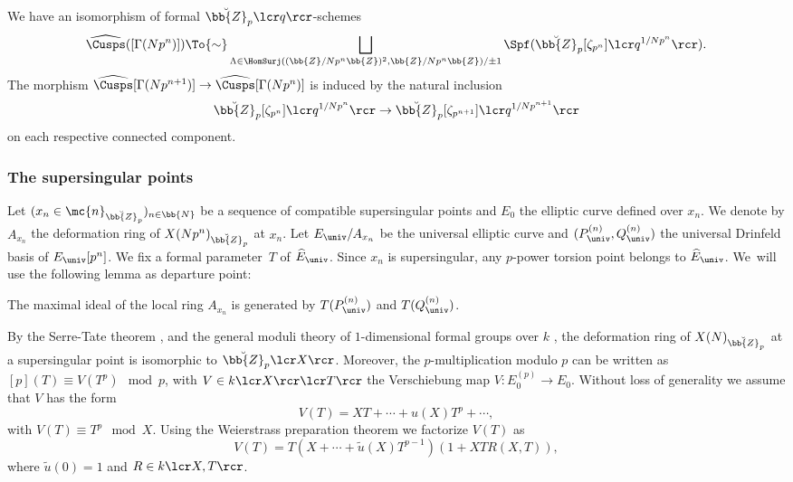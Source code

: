 \begin{prop}
\label{Theorem structure cusps 2}
We have an isomorphism of formal $\breve{\bb{Z}}_p\lcr q\rcr$-schemes
\begin{equation*}
\widehat{\Cusps}(\left[\Gamma(Np^n)\right]) \To{\sim} \displaystyle\bigsqcup_{\Lambda\in \HomSurj((\bb{Z}/Np^n\bb{Z})^2,\bb{Z}/Np^n\bb{Z})/\pm 1} \Spf (\breve{\bb{Z}}_p[\zeta_{p^n}]\lcr q^{1/Np^n}\rcr).
\end{equation*}
The morphism $\widehat{\Cusps}[\Gamma(Np^{n+1})]\to \widehat{\Cusps}[\Gamma(Np^n)]$ is induced by the natural inclusion
\[
\breve{\bb{Z}}_p[\zeta_{p^n}]\lcr q^{1/Np^{n}}\rcr\to \breve{\bb{Z}}_p[\zeta_{p^{n+1}}]\lcr q^{1/Np^{n+1}}\rcr
\]
on each respective connected component.
\end{prop}

\subsubsection*{The supersingular points}

Let $(x_n\in \mc{n}_{\breve{\bb{Z}}_p})_{n\in \bb{N}}$ be a sequence of compatible supersingular points and $E_0$ the elliptic curve defined over $x_n$. We denote by $A_{x_n}$ the deformation ring of $X(Np^n)_{\breve{\bb{Z}}_p}$ at $x_n$. Let $E_{\univ}/A_{x_n}$ be the universal elliptic curve and $(P^{(n)}_{\univ},Q^{(n)}_{\univ})$ the universal Drinfeld basis of $E_{\univ}[p^n]$. We fix a formal parameter~$T$ of $\widehat{E}_{\univ}$. Since $x_n$ is supersingular, any $p$-power torsion point belongs to $\widehat{E}_{\univ}$. We~will use the following lemma as departure point:

\begin{lem}
\label{Lemma generators max ideal}
The maximal ideal of the local ring $A_{x_n}$ is generated by $T(P^{(n)}_{\univ})$ and $T(Q^{(n)}_{\univ})$.
\end{lem}

By the Serre-Tate theorem \cite[Th.\,1.2.1]{katz1981serre}, and the general moduli theory of $1$-dimensional formal groups over $k$ \cite{MR238854}, the deformation ring of $X(N)_{\breve{\bb{Z}}_p}$ at a supersingular point is isomorphic to $\breve{\bb{Z}}_p\lcr X\rcr$. Moreover, the $p$-multiplication modulo $p$ can be written as $[p](T)\equiv V(T^p) \mod p$, with $V\in k\lcr X\rcr\lcr T\rcr$ the Verschiebung map $V: E_0^{(p)}\to E_0$. Without loss of generality we assume that $V$ has the form
\[
V(T)= XT+\cdots+ u(X)T^p+\cdots,
\]
with $V(T)\equiv T^p \mod X$. Using the Weierstrass preparation theorem we factorize $V(T)$ as
\begin{equation}
\label{verschpowerseries}
V(T)=T(X+\cdots +\tilde{u}(X)T^{p-1})(1+XT R(X,T)),
\end{equation}
where $\tilde{u}(0)=1$ and $R\in k\lcr X,T\rcr$.

